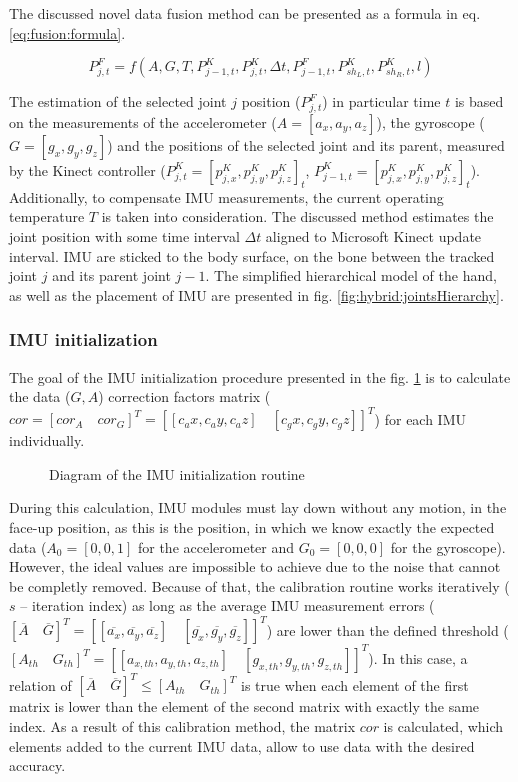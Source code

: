 \documentclass[sensors,article,submit,moreauthors,pdftex,10pt,a4paper]{mdpi}
\begin{document}
	The discussed novel data fusion method can be presented as a formula in eq. \ref{eq:fusion:formula}.
		
	\begin{equation}
		P^F_{j,t} = f(A,G,T,P_{j-1,t}^K,P_{j,t}^K,\Delta t, P^F_{j-1,t}, P^K_{sh_L,t},P^K_{sh_R,t},l) 
		\label{eq:fusion:formula}
	\end{equation}
		
	The estimation of the selected joint $j$ position ($P^F_{j,t}$) in particular time $t$ is based on the measurements of the accelerometer ($A=[a_x,a_y,a_z]$), the gyroscope ($G=[g_x,g_y,g_z]$) and the positions of the selected joint and its parent, measured by the Kinect controller ($P^K_{j,t} = [p^K_{j,x}, p^K_{j,y}, p^K_{j,z}]_t$, $P^K_{j-1,t} = [p^K_{j,x}, p^K_{j,y}, p^K_{j,z}]_t$). Additionally, to compensate IMU measurements, the current operating temperature $T$ is taken into consideration. The discussed method estimates the joint position with some time interval $\Delta t$ aligned to Microsoft Kinect update interval. IMU are sticked to the body surface, on the bone between the tracked joint $j$ and its parent joint $j-1$. The simplified hierarchical model of the hand, as well as the placement of IMU are presented in fig. \ref{fig:hybrid:jointsHierarchy}.	
		
	\subsubsection{IMU initialization}
	The goal of the IMU initialization procedure presented in the fig. \ref{fig:hybrid:IMUCalibration} is to calculate the data ($G, A$) correction factors matrix ($cor = [cor_A \quad cor_G]^T = [[c_ax,c_ay,c_az ]\quad[c_gx,c_gy,c_gz ]]^T $) for each IMU individually. 
	
	\begin{figure}[!htb]
		\scalebox{0.55}{		
			
		}
		\caption{Diagram of the IMU initialization routine}
		\label{fig:hybrid:IMUCalibration}
	\end{figure}
	
	During this calculation, IMU modules must lay down without any motion, in the face-up position, as this is the position, in which we know exactly the expected data ($A_0=[0,0,1]$ for the accelerometer and $G_0=[0,0,0]$ for the gyroscope). However, the ideal values are impossible to achieve due to the noise that cannot be completly removed. Because of that, the calibration routine works iteratively ($s$ -- iteration index) as long as the average IMU measurement errors ($[\overline{A}\quad \overline{G}]^T = [[\overline{a_x},\overline{a_y},\overline{a_z}]\quad[\overline{g_x},\overline{g_y},\overline{g_z}]]^T$) are lower than the defined threshold ($[A_{th}\quad G_{th}]^T = [[a_{x,th},a_{y,th},a_{z,th}]\quad[g_{x,th},g_{y,th},g_{z,th}]]^T$). In this case, a relation of $[\overline{A}\quad \overline{G}]^T \le [A_{th}\quad G_{th}]^T$ is true when each element of the first matrix is lower than the element of the second matrix with exactly the same index. As a result of this calibration method, the matrix $cor$ is calculated, which elements added to the current IMU data, allow to use data with the desired accuracy. 
		
\end{document}
